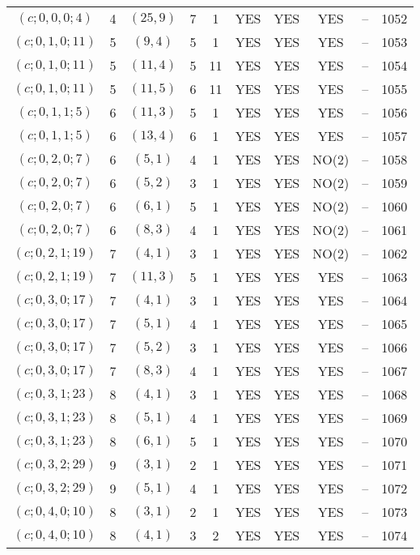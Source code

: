 \begin{longtable}{|c|c|c|c|c|c|c|c|c|c|}
$(c; 0, 0, 0; 4)$ & 4 & $(25, 9)$ & 7 & 1 & YES & YES & YES & -- & 1052\\
$(c; 0, 1, 0; 11)$ & 5 & $(9, 4)$ & 5 & 1 & YES & YES & YES & -- & 1053\\
$(c; 0, 1, 0; 11)$ & 5 & $(11, 4)$ & 5 & 11 & YES & YES & YES & -- & 1054\\
$(c; 0, 1, 0; 11)$ & 5 & $(11, 5)$ & 6 & 11 & YES & YES & YES & -- & 1055\\
$(c; 0, 1, 1; 5)$ & 6 & $(11, 3)$ & 5 & 1 & YES & YES & YES & -- & 1056\\
$(c; 0, 1, 1; 5)$ & 6 & $(13, 4)$ & 6 & 1 & YES & YES & YES & -- & 1057\\
$(c; 0, 2, 0; 7)$ & 6 & $(5, 1)$ & 4 & 1 & YES & YES & NO(2) & -- & 1058\\
$(c; 0, 2, 0; 7)$ & 6 & $(5, 2)$ & 3 & 1 & YES & YES & NO(2) & -- & 1059\\
$(c; 0, 2, 0; 7)$ & 6 & $(6, 1)$ & 5 & 1 & YES & YES & NO(2) & -- & 1060\\
$(c; 0, 2, 0; 7)$ & 6 & $(8, 3)$ & 4 & 1 & YES & YES & NO(2) & -- & 1061\\
$(c; 0, 2, 1; 19)$ & 7 & $(4, 1)$ & 3 & 1 & YES & YES & NO(2) & -- & 1062\\
$(c; 0, 2, 1; 19)$ & 7 & $(11, 3)$ & 5 & 1 & YES & YES & YES & -- & 1063\\
$(c; 0, 3, 0; 17)$ & 7 & $(4, 1)$ & 3 & 1 & YES & YES & YES & -- & 1064\\
$(c; 0, 3, 0; 17)$ & 7 & $(5, 1)$ & 4 & 1 & YES & YES & YES & -- & 1065\\
$(c; 0, 3, 0; 17)$ & 7 & $(5, 2)$ & 3 & 1 & YES & YES & YES & -- & 1066\\
$(c; 0, 3, 0; 17)$ & 7 & $(8, 3)$ & 4 & 1 & YES & YES & YES & -- & 1067\\
$(c; 0, 3, 1; 23)$ & 8 & $(4, 1)$ & 3 & 1 & YES & YES & YES & -- & 1068\\
$(c; 0, 3, 1; 23)$ & 8 & $(5, 1)$ & 4 & 1 & YES & YES & YES & -- & 1069\\
$(c; 0, 3, 1; 23)$ & 8 & $(6, 1)$ & 5 & 1 & YES & YES & YES & -- & 1070\\
$(c; 0, 3, 2; 29)$ & 9 & $(3, 1)$ & 2 & 1 & YES & YES & YES & -- & 1071\\
$(c; 0, 3, 2; 29)$ & 9 & $(5, 1)$ & 4 & 1 & YES & YES & YES & -- & 1072\\
$(c; 0, 4, 0; 10)$ & 8 & $(3, 1)$ & 2 & 1 & YES & YES & YES & -- & 1073\\
$(c; 0, 4, 0; 10)$ & 8 & $(4, 1)$ & 3 & 2 & YES & YES & YES & -- & 1074\\

\end{longtable}
